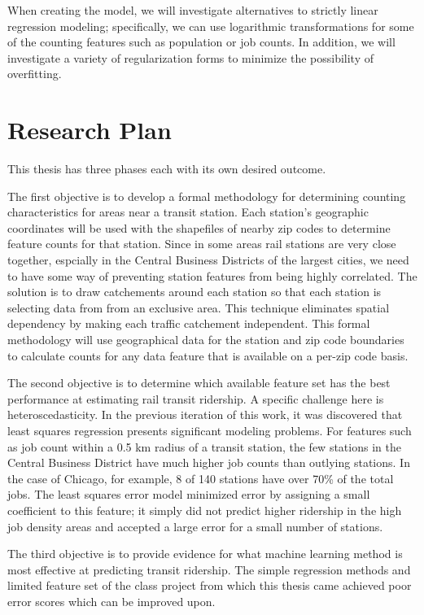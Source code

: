 \documentclass{article}
\begin{document}
When creating the model, we will investigate alternatives to strictly linear regression modeling; specifically, we can use logarithmic transformations for some of the counting features such as population or job counts. In addition, we will investigate a variety of regularization forms to minimize the possibility of overfitting. 

\section{Research Plan}

This thesis has three phases each with its own desired outcome.

The first objective is to develop a formal methodology for determining counting characteristics for areas near a transit station. Each station's geographic coordinates will be used with the shapefiles of nearby zip codes to determine feature counts for that station. Since in some areas rail stations are very close together, espcially in the Central Business Districts of the largest cities, we need to have some way of preventing station features from being highly correlated. The solution is to draw catchements around each station so that each station is selecting data from from an exclusive area. This technique eliminates spatial dependency by making each traffic catchement independent. This formal methodology will use geographical data for the station and zip code boundaries to calculate counts for any data feature that is available on a per-zip code basis. 

The second objective is to determine which available feature set has the best performance at estimating rail transit ridership. A specific challenge here is heteroscedasticity. In the previous iteration of this work, it was discovered that least squares regression presents significant modeling problems. For features such as job count within a 0.5 km radius of a transit station, the few stations in the Central Business District have much higher job counts than outlying stations. In the case of Chicago, for example, 8 of 140 stations have over 70\% of the total jobs. The least squares error model minimized error by assigning a small coefficient to this feature; it simply did not predict higher ridership in the high job density areas and accepted a large error for a small number of stations. 

The third objective is to provide evidence for what machine learning method is most effective at predicting transit ridership. The simple regression methods and limited feature set of the class project from which this thesis came achieved poor error scores which can be improved upon. 
\end{document}

